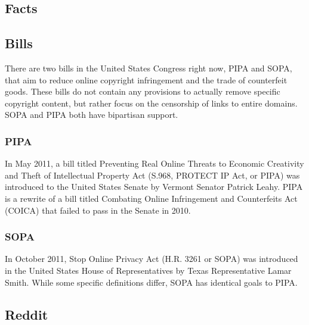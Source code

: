 \documentclass[11pt]{article}
\begin{document}


\begin{multicols}{2}
\setcounter{page}{1}


   \section{Facts}

   \subsection{Bills}

There are two bills in the United States Congress right now, PIPA and SOPA, that aim to reduce online copyright infringement and the trade of counterfeit goods.\cite{pipa}\cite{sopa} These bills do not contain any provisions to actually remove specific copyright content, but rather focus on the censorship of links to entire domains.\cite{reddit-sopapipa-explaination} SOPA and PIPA both have bipartisan support.\cite{bipartisan}

   \subsubsection{PIPA}

In May 2011, a bill titled Preventing Real Online Threats to Economic Creativity and Theft of Intellectual Property Act (S.968, PROTECT IP Act, or PIPA) was introduced to the United States Senate by Vermont Senator Patrick Leahy.\cite{pipa} PIPA is a rewrite of a bill titled Combating Online Infringement and Counterfeits Act (COICA) that failed to pass in the Senate in 2010.\cite{coica}

   \subsubsection{SOPA}

In October 2011, Stop Online Privacy Act (H.R. 3261 or SOPA) was introduced in the United States House of Representatives by Texas Representative Lamar Smith.\cite{sopa} While some specific definitions differ, SOPA has identical goals to PIPA.\cite{sopa-vs-pipa}

   \subsection{Reddit}


\end{multicols}
\end{document}
